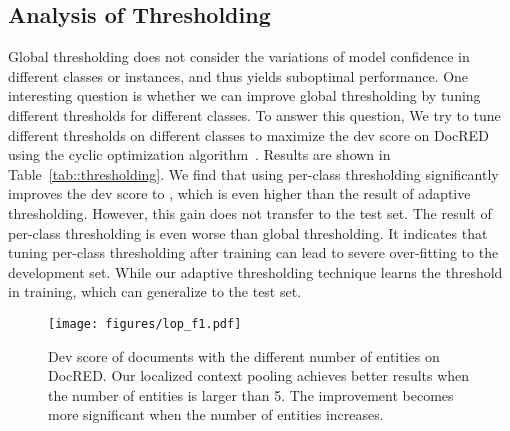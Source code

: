 \documentclass[letterpaper]{article}
\begin{document}
\begin{table}[!t]
\centering
{}
    \caption{Result of different thresholding strategies on DocRED. Our adaptive thresholding consistently outperforms other strategies on the test set.}
    \label{tab::thresholding}
\end{table}

\subsection{Analysis of Thresholding}
Global thresholding does not consider the variations of model confidence in different classes or instances, and thus yields suboptimal performance.
One interesting question is whether we can improve global thresholding by tuning different thresholds for different classes.
To answer this question, We try to tune different thresholds on different classes to maximize the dev  score on DocRED using the cyclic optimization algorithm~\cite{Fan2007ASO}.
Results are shown in Table~\ref{tab::thresholding}.
We find that using per-class thresholding significantly improves the dev  score to , which is even higher than the result of adaptive thresholding.
However, this gain does not transfer to the test set.
The result of per-class thresholding is even worse than global thresholding.
It indicates that tuning per-class thresholding after training can lead to severe over-fitting to the development set.
While our adaptive thresholding technique learns the threshold in training, which can generalize to the test set.

\begin{figure}[!t]
    \centering
    \texttt{[image: figures/lop\_f1.pdf]}
    \caption{Dev  score of documents with the different number of entities on DocRED. Our localized context pooling achieves better results when the number of entities is larger than 5. The improvement becomes more significant when the number of entities increases.
    }
    \label{fig:lop_f1}
\end{figure}
\end{document}
